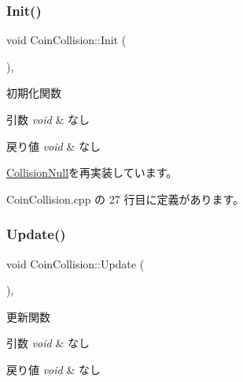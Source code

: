 \subsubsection{\texorpdfstring{Init()}{Init()}}
{\footnotesize\ttfamily void Coin\+Collision\+::\+Init (\begin{DoxyParamCaption}{ }\end{DoxyParamCaption})\hspace{0.3cm}{\ttfamily [override]}, {\ttfamily [virtual]}}



初期化関数 


\begin{DoxyParams}{引数}
{\em void} & なし \\
\hline
\end{DoxyParams}

\begin{DoxyRetVals}{戻り値}
{\em void} & なし \\
\hline
\end{DoxyRetVals}


\mbox{\hyperlink{class_collision_null_a18cfc21fefcd3e8dec380ac44a85f111}{Collision\+Null}}を再実装しています。



 Coin\+Collision.\+cpp の 27 行目に定義があります。

\mbox{\label{class_coin_collision_a981fd9b1b8c688a757a456a56d80501b}} 
\subsubsection{\texorpdfstring{Update()}{Update()}}
{\footnotesize\ttfamily void Coin\+Collision\+::\+Update (\begin{DoxyParamCaption}{ }\end{DoxyParamCaption})\hspace{0.3cm}{\ttfamily [override]}, {\ttfamily [virtual]}}



更新関数 


\begin{DoxyParams}{引数}
{\em void} & なし \\
\hline
\end{DoxyParams}

\begin{DoxyRetVals}{戻り値}
{\em void} & なし \\
\hline
\end{DoxyRetVals}


